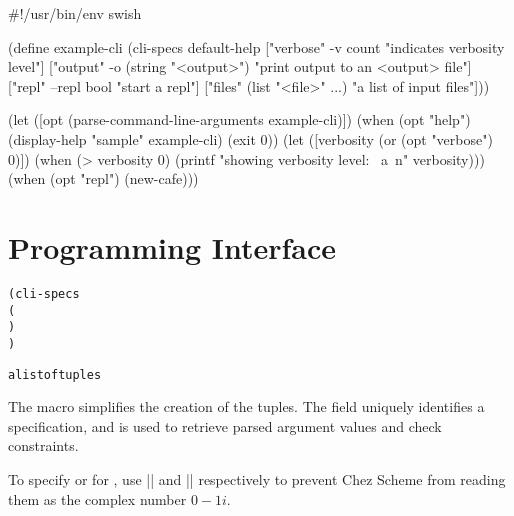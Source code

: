 \codebegin
#!/usr/bin/env swish

(define example-cli
  (cli-specs
   default-help
   ["verbose" -v count "indicates verbosity level"]
   ["output" -o (string "<output>") "print output to an <output> file"]
   ["repl" --repl bool "start a repl"]
   ["files" (list "<file>" ...) "a list of input files"]))

(let ([opt (parse-command-line-arguments example-cli)])
  (when (opt "help")
    (display-help "sample" example-cli)
    (exit 0))
  (let ([verbosity (or (opt "verbose") 0)])
    (when (> verbosity 0)
      (printf "showing verbosity level: ~a~n" verbosity)))
  (when (opt "repl")
    (new-cafe)))
\codeend

\section {Programming Interface}

\begin{syntax}
  \begin{alltt}
(cli-specs
  (    
    )
  \etc{})\strut\end{alltt}
\end{syntax}
\expandsto{}\begin{alltt}\antipar
a list of  tuples
\end{alltt}

The  macro simplifies the creation of the
 tuples. The   field
uniquely identifies a specification, and is used to retrieve parsed
argument values and check constraints.

\begin{argtbl}
\end{argtbl}

To specify  or  for , use || and
|| respectively to prevent Chez Scheme from reading them as
the complex number $0-1i$.

